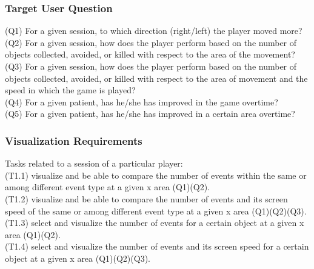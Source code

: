 \documentclass{beamer}
\begin{document}
\begin{frame}
\frametitle{Target User Question}
(Q1) For a given session, to which direction (right/left) the player moved more?\\ 
(Q2) For a given session, how does the player perform based on the number of objects collected, avoided, or killed with respect to the area of the movement?\\
(Q3) For a given session, how does the player perform based on the number of objects collected, avoided, or killed with respect to the area of movement and the speed in which the game is played?\\ 
(Q4) For a given patient, has he/she has improved in the game overtime?\\ 
(Q5) For a given patient, has he/she has improved in a certain area overtime?


\end{frame}

\begin{frame}
\frametitle{Visualization Requirements}
Tasks related to a session of a particular player:\\
(T1.1) visualize and be able to compare the number of events within the same or among different event type at a given x area (Q1)(Q2). \\
(T1.2) visualize and be able to compare the number of events and its screen speed of the same or among different event type at a given x area (Q1)(Q2)(Q3). \\
(T1.3) select and visualize the number of events for a certain object at a given x area (Q1)(Q2). \\
(T1.4) select and visualize the number of events and its screen speed for a certain object at a given x area (Q1)(Q2)(Q3). 
\end{frame}
\end{document}
